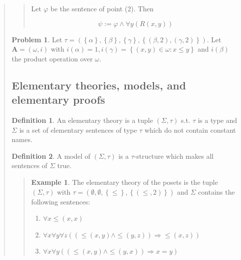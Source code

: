 \documentclass[a4paper, 12pt]{article}
\theoremstyle{definition}
\newtheorem{problem}{Problem}
\theoremstyle{definition}
\newtheorem{example}{Example}
\theoremstyle{definition}
\newtheorem{definition}{Definition}
\begin{document}
\begin{quote}
\begin{quote}
    Let $\varphi$ be the sentence of point (2). Then 

    \begin{equation*}
        \psi := \varphi \land \forall y (R(x, y))
    \end{equation*}


\end{quote}
\normalsize

\begin{problem}
    Let $\tau = \left( \left\{ \alpha \right\}, \left\{ \beta \right\}, \left\{ \gamma \right\}, \left\{ (\beta, 2), (\gamma, 2) \right\}     \right) $. Let $\textbf{A} = (\omega, i)$ with $i(\alpha) = 1, i(\gamma) = \left\{ (x, y) \in \omega : x \leq y \right\}  $ and $i(\beta)$ the product operation over $\omega$.
\end{problem}


\subsection{Elementary theories, models, and elementary proofs}

\begin{definition}
    An elementary theory is a tuple $(\Sigma, \tau)$ s.t. $\tau$ is a type and $\Sigma$
    is a set of elementary sentences of type $\tau$ which do not 
    contain constant names.
\end{definition}

\begin{definition}
    A model of $(\Sigma, \tau)$ is a $\tau$-structure which makes all 
    sentences of $\Sigma$ true.
\end{definition}


\small
\begin{quote}

\begin{example}
    The elementary theory of the posets is the tuple $(\Sigma, \tau)$ with 
    $\tau = (\emptyset, \emptyset, \left\{ \leq \right\}, \left\{ (\leq, 2) \right\} )$ 
    and $\Sigma$ contains the following sentences: 

    \begin{enumerate}
        \item $\forall x  \leq(x, x)$
        \item $\forall x \forall y \forall z \left( (\leq(x, y) \land  \leq(y, z) ) \Rightarrow\leq(x, z) \right) $
        \item $\forall x \forall y \left( (\leq(x, y) \land  \leq(y, x)) \Rightarrow x = y \right) $
    \end{enumerate}


\end{example}
\end{quote}
\end{quote}
\end{document}
